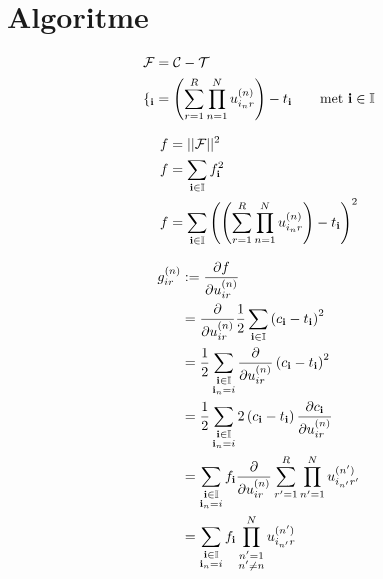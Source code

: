 \chapter{Algoritme}
\label{h:algo} 

\begin{align*}
    \mathcal{F} &= \mathcal{C} - \mathcal{T}\\
    \mathcal{f_{\textbf{i}}} &= \left( \sum_{r=1}^{R} \prod_{n=1}^{N} u^{(n)}_{i_{n}r} \right) - t_{\textbf{i}} \qquad \text{met $\textbf{i} \in \mathbb{I}$}
\end{align*}

\begin{align*}
    f &= ||\mathcal{F}||^2\\
    f &= \sum_{\textbf{i} \in \mathbb{I}} f_{\textbf{i}}^2\\
    f &=  \sum_{\textbf{i} \in \mathbb{I}} \left( \left( \sum_{r=1}^{R} \prod_{n=1}^{N} u^{(n)}_{i_{n}r} \right) - t_{\textbf{i}} \right)^2 \\
\end{align*}

\begin{align*}
    g^{(n)}_{ir} 	&:= \frac{\partial f}{\partial u^{(n)}_{ir}}\\
					&=\frac{\partial}{\partial u^{(n)}_{ir}} \frac{1}{2}\sum_{\textbf{i} \in \mathbb{I}}\left(c_{\textbf{i}} - t_{\textbf{i}} \right)^2\\
					&= \frac{1}{2} \sum_{\substack{\textbf{i} \in \mathbb{I}\\ \textbf{i}_n = i}} \frac{\partial}{\partial u^{(n)}_{ir}} \left(c_{\textbf{i}} - t_{\textbf{i}} \right)^2\\
					&= \frac{1}{2} \sum_{\substack{\textbf{i} \in \mathbb{I}\\ \textbf{i}_n = i}} 2 \left(c_{\textbf{i}} - t_{\textbf{i}} \right) \frac{\partial c_{\textbf{i}}}{\partial u^{(n)}_{ir}}\\
					&=\sum_{\substack{\textbf{i} \in \mathbb{I}\\ \textbf{i}_n = i}} f_{\textbf{i}} \frac{\partial}{\partial u^{(n)}_{ir}} \sum_{r'=1}^{R} \prod_{n'=1}^{N} u^{(n')}_{i_{n'}r'}\\
					&=\sum_{\substack{\textbf{i} \in \mathbb{I}\\ \textbf{i}_n = i}} f_{\textbf{i}} \prod_{\substack{n'=1\\n'\neq n}}^{N} u^{(n')}_{i_{n'}r}\\
\end{align*}

